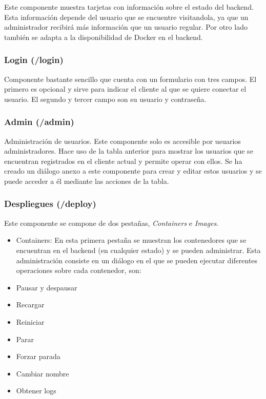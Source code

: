 Este componente muestra tarjetas con información sobre el estado del backend. Esta información depende del usuario que se encuentre visitandola, ya que un administrador recibirá más información que un usuario regular. Por otro lado también se adapta a la disponibilidad de Docker en el backend.


\subsubsection{Login (/login)}


Componente bastante sencillo que cuenta con un formulario con tres campos. El primero es opcional y sirve para indicar el cliente al que se quiere conectar el usuario. El segundo y tercer campo son su usuario y contraseña.


\subsubsection{Admin (/admin)}


Administración de usuarios. Este componente solo es accesible por usuarios administradores. Hace uso de la tabla anterior para mostrar los usuarios que se encuentran registrados en el cliente actual y permite operar con ellos. Se ha creado un diálogo anexo a este componente para crear y editar estos usuarios y se puede acceder a él mediante las acciones de la tabla.



\subsubsection{Despliegues (/deploy)}

Este componente se compone de dos pestañas, \textit{Containers} e \textit{Images}.
\begin{itemize}
	\item Containers: En esta primera pestaña se muestran los contenedores que se encuentran en el backend (en cualquier estado) y se pueden administrar. Esta administración consiste en un diálogo en el que se pueden ejecutar diferentes operaciones sobre cada contenedor, son:
	\item Pausar y despausar
	\item Recargar
	\item Reiniciar
	\item Parar
	\item Forzar parada
	\item Cambiar nombre
	\item Obtener logs
\end{itemize}

